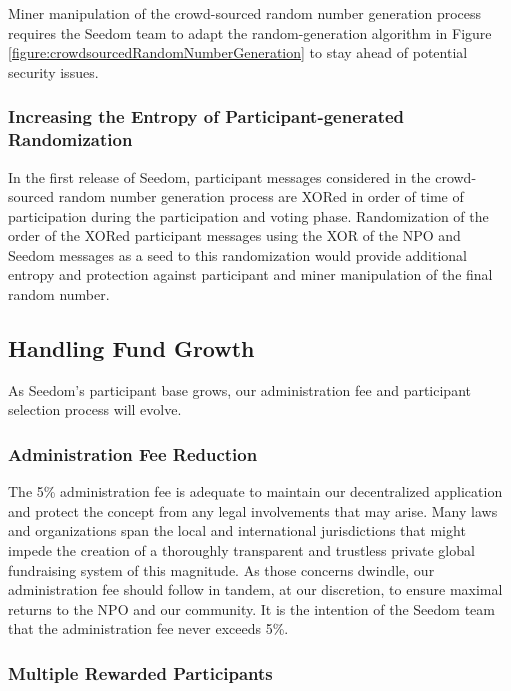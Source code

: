 \documentclass[11pt]{article}
\begin{document}
Miner manipulation of the crowd-sourced random number generation process requires the Seedom team to adapt the random-generation algorithm in Figure \ref{figure:crowdsourcedRandomNumberGeneration} to stay ahead of potential security issues.

\subsubsection{Increasing the Entropy of Participant-generated Randomization}
\label{sec:increasingTheEntropyOfParticipantGeneratedRandomization}

In the first release of Seedom, participant messages considered in the crowd-sourced random number generation process are XORed in order of time of participation during the participation and voting phase. Randomization of the order of the XORed participant messages using the XOR of the NPO and Seedom messages as a seed to this randomization would provide additional entropy and protection against participant and miner manipulation of the final random number.

\subsection{Handling Fund Growth}

As Seedom's participant base grows, our administration fee and participant selection process will evolve.

\subsubsection{Administration Fee Reduction}

The 5\% administration fee is adequate to maintain our decentralized application and protect the concept from any legal involvements that may arise. Many laws and organizations span the local and international jurisdictions that might impede the creation of a thoroughly transparent and trustless private global fundraising system of this magnitude. As those concerns dwindle, our administration fee should follow in tandem, at our discretion, to ensure maximal returns to the NPO and our community. It is the intention of the Seedom team that the administration fee never exceeds 5\%.

\subsubsection{Multiple Rewarded Participants}
\end{document}
